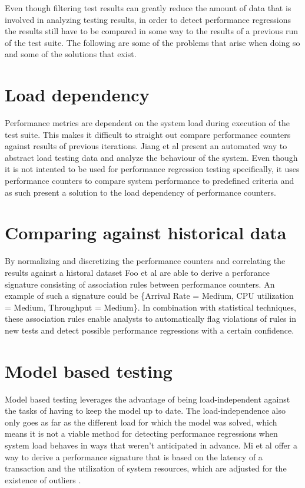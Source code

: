 Even though filtering test results can greatly reduce the amount of data that is involved in analyzing testing results, in order to detect performance regressions the results still have to be compared in some way to the results of a previous run of the test suite. The following are some of the problems that arise when doing so and some of the solutions that exist.

\section{Load dependency}
Performance metrics are dependent on the system load during execution of the test suite. This makes it difficult to straight out compare performance counters against results of previous iterations. Jiang et al present an automated way to abstract load testing data and analyze the behaviour of the system. \cite{jiang2010automated} Even though it is not intented to be used for performance regression testing specifically, it uses performance counters to compare system performance to predefined criteria and as such present a solution to the load dependency of performance counters.

\section{Comparing against historical data}
By normalizing and discretizing the performance counters and correlating the results against a historal dataset Foo et al are able to derive a perforance signature \cite{foo2010mining} consisting of association rules between performance counters. An example of such a signature could be \{Arrival Rate = Medium, CPU utilization = Medium, Throughput = Medium\}. In combination with statistical techniques, these association rules enable analysts to automatically flag violations of rules in new tests and detect possible performance regressions with a certain confidence.

\section{Model based testing}
Model based testing leverages the advantage of being load-independent against the tasks of having to keep the model up to date. The load-independence also only goes as far as the different load for which the model was solved, which means it is not a viable method for detecting performance regressions when system load behaves in ways that weren't anticipated in advance. Mi et al offer a way to derive a performance signature that is based on the latency of a transaction and the utilization of system resources, which are adjusted for the existence of outliers \cite{mi2008analysis}.

